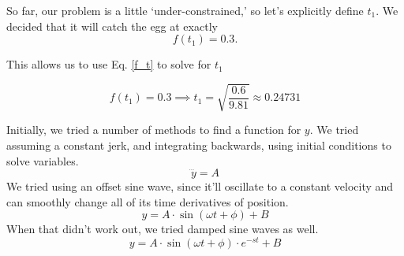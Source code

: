 \documentclass[nofoot,pdf-a,balance,colorlinks,upint,subscriptcorrection,varvw,mathalfa=cal=boondoxo]{asmeconf}
\begin{document}
         So far, our problem is a little `under-constrained,' so let's explicitly define $t_1$. We decided that it will catch the egg at exactly
	\begin{equation}
	f\left(t_1\right) = 0.3. 
	\end{equation}

	This allows us to use Eq. \eqref{f_t} to solve for $t_1$

         \begin{equation} 
             f(t_1) = 0.3 \implies t_1 = \sqrt{\frac{0.6}{9.81}} \approx 0.24731
         \end{equation}
     
       Initially, we tried a number of methods to find a function for $y$. We tried assuming a constant jerk, and integrating backwards, using initial conditions to solve variables. 
    \begin{equation*}
        \dddot{y} = A
    \end{equation*}
        We tried using an offset sine wave, since it'll oscillate to a constant velocity and can smoothly change all of its time derivatives of position.
    \begin{equation*}
        y = A \cdot \sin{\left(\omega t + \phi\right)} + B
    \end{equation*}
        When that didn't work out, we tried damped sine waves as well.
    \begin{equation*}
        y = A \cdot \sin{\left(\omega t + \phi\right)}\cdot e^{-st} + B
    \end{equation*}
\end{document}
